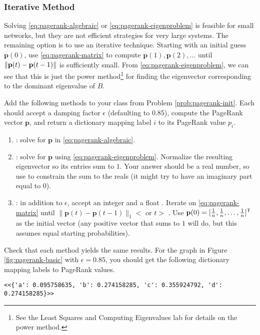 \subsubsection*{Iterative Method} %

Solving \eqref{eq:pagerank-algebraic} or \eqref{eq:pagerank-eigenproblem} is feasible for small networks, but they are not efficient strategies for very large systems.
The remaining option is to use an iterative technique.
Starting with an initial guess $\mathbf{p}(0)$, use  \eqref{eq:pagerank-matrix} to compute $\mathbf{p}(1),\mathbf{p}(2),\ldots$ until $\left\lVert\mathbf{p}(t)-\mathbf{p}(t-1)\right\rVert$ is sufficiently small.
From \eqref{eq:pagerank-eigenproblem}, we can see that this is just the power method\footnote{See the Least Squares and Computing Eigenvalues lab for details on the power method.} for finding the eigenvector corresponding to the dominant eigenvalue of $B$.

\begin{problem} %
Add the following methods to your class from Problem \ref{prob:pagerank-init}.
Each should accept a damping factor $\epsilon$ (defaulting to 0.85), compute the PageRank vector $\mathbf{p}$, and return a dictionary mapping label $i$ to its PageRank value $p_i$.

\begin{enumerate}
\item {}: solve for $\mathbf{p}$ in \eqref{eq:pagerank-algebraic}.
\item {}: solve for $\mathbf{p}$ using \eqref{eq:pagerank-eigenproblem}.
Normalize the resulting eigenvector so its entries sum to $1$.
Your answer should be a real number, so use  to constrain the sum to the reals (it might try to have an imaginary part equal to 0).
\item {}: in addition to $\epsilon$, accept an integer  and a float .
Iterate on \eqref{eq:pagerank-matrix} until $\|\mathbf{p}(t) - \mathbf{p}(t-1)\|_1 < $  or $t > $ .
Use $\mathbf{p}(0)=[\frac{1}{n},\frac{1}{n},\ldots,\frac{1}{n}]^{\mathsf T}$ as the initial vector (any positive vector that sums to $1$ will do, but this assumes equal starting probabilities).
\end{enumerate}
Check that each method yields the same results.
For the graph in Figure \ref{fig:pagerank-basic} with $\epsilon=0.85$, you should get the following dictionary mapping labels to PageRank values.
\begin{lstlisting}
<<{'a': 0.095758635, 'b': 0.274158285, 'c': 0.355924792, 'd': 0.274158285}>>
\end{lstlisting}
\label{prob:pagerank-computation}
\end{problem}

